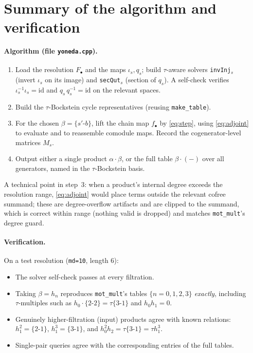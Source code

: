 \documentclass[11pt]{article}
\newcommand{\id}{\mathrm{id}}
\theoremstyle{definition}
\begin{document}
\section{Summary of the algorithm and verification}

\paragraph{Algorithm (file \texttt{yoneda.cpp}).}
\begin{enumerate}[leftmargin=*,itemsep=1pt]
\item Load the resolution $F_\bullet$ and the maps $\iota_s,q_s$; build $\tau$-aware
  solvers \texttt{invInj}$_s$ (invert $\iota_s$ on its image) and \texttt{secQut}$_s$
  (section of $q_s$). A self-check verifies
  $\iota_s^{-1}\iota_s=\id$ and $q_s\,q_s^{-1}=\id$ on the relevant spaces.
\item Build the $\tau$-Bockstein cycle representatives (reusing
  \texttt{make\_table}).
\item For the chosen $\beta=\{s'\text{-}b\}$, lift the chain map $f_\bullet$ by
  \eqref{eq:step}, using \eqref{eq:adjoint} to evaluate and to reassemble comodule
  maps. Record the cogenerator-level matrices $M_s$.
\item Output either a single product $\alpha\cdot\beta$, or the full table
  $\beta\cdot(-)$ over all generators, named in the $\tau$-Bockstein basis.
\end{enumerate}
A technical point in step~3: when a product's internal degree exceeds the resolution
range, \eqref{eq:adjoint} would place terms outside the relevant cofree summand;
these are degree-overflow artifacts and are clipped to the summand, which is correct
within range (nothing valid is dropped) and matches \texttt{mot\_mult}'s degree
guard.

\paragraph{Verification.}
On a test resolution (\texttt{md=10}, length $6$):
\begin{itemize}[leftmargin=*,itemsep=1pt]
\item The solver self-check passes at every filtration.
\item Taking $\beta=h_n$ reproduces \texttt{mot\_mult}'s tables
  $\{n=0,1,2,3\}$ \emph{exactly}, including $\tau$-multiples such as
  $h_0\cdot\{2\text{-}2\}=\tau\{3\text{-}1\}$ and $h_0h_1=0$.
\item Genuinely higher-filtration (input) products agree with known relations:
  $h_1^2=\{2\text{-}1\}$, $h_1^3=\{3\text{-}1\}$, and
  $h_0^2h_2=\tau\{3\text{-}1\}=\tau h_1^3$.
\item Single-pair queries agree with the corresponding entries of the full tables.
\end{itemize}
\end{document}
